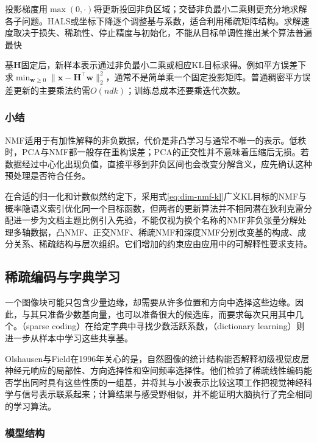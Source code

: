 投影梯度用$\max(0,\cdot)$将更新投回非负区域；交替非负最小二乘则更充分地求解各子问题。HALS或坐标下降逐个调整基与系数，适合利用稀疏矩阵结构。求解速度取决于损失、稀疏性、停止精度与初始化，不能从目标单调性推出某个算法普遍最快

基$\bm{H}$固定后，新样本表示通过非负最小二乘或相应KL目标求得。例如平方误差下求$\min_{\bm{w}\geq0}\lVert\bm{x}-\bm{H}^{\top}\bm{w}\rVert_2^2$，通常不是简单乘一个固定投影矩阵。普通稠密平方误差更新的主要乘法约需$O(ndk)$；训练总成本还要乘迭代次数。

\subsubsection{小结}
\label{sec:dim-nmf-summary}

NMF适用于有加性解释的非负数据，代价是非凸学习与通常不唯一的表示。低秩时，PCA与NMF都一般存在重构误差；PCA的正交性并不意味着压缩后无损。若数据经过中心化出现负值，直接平移到非负区间也会改变分解含义，应先确认这种预处理是否符合任务。

在合适的归一化和计数似然约定下，采用式\eqref{eq:dim-nmf-kl}广义KL目标的NMF与概率隐语义索引优化同一个目标函数，但两者的更新算法并不相同潜在狄利克雷分配进一步为文档主题比例引入先验，不能仅视为换个名称的NMF非负张量分解处理多轴数据，凸NMF、正交NMF、稀疏NMF和深度NMF分别改变基的构成、成分关系、稀疏结构与层次组织。它们增加的约束应由应用中的可解释性要求支持。

\subsection{稀疏编码与字典学习}
\label{sec:dim-sparse-coding}

一个图像块可能只包含少量边缘，却需要从许多位置和方向中选择这些边缘。因此，与其只准备少数基向量，也可以准备很大的候选库，而要求每次只用其中几个。（sparse coding）在给定字典中寻找少数活跃系数，（dictionary learning）则进一步从样本中学习这些共享基。

Olshausen与Field在1996年关心的是，自然图像的统计结构能否解释初级视觉皮层神经元响应的局部性、方向选择性和空间频率选择性。他们检验了稀疏线性编码能否学出同时具有这些性质的一组基，并将其与小波表示比较这项工作把视觉神经科学与信号表示联系起来；计算结果与感受野相似，并不能证明大脑执行了完全相同的学习算法。

\subsubsection{模型结构}
\label{sec:dim-sparse-coding-structure}

